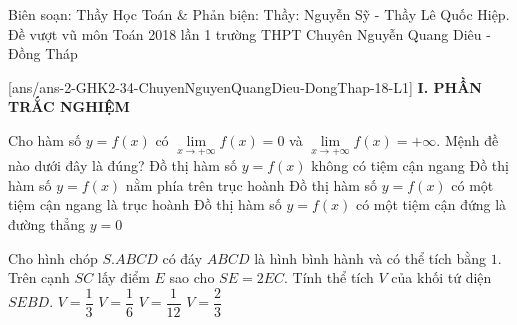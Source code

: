 
\begin{name}
{Biên soạn: Thầy Học Toán  \& Phản biện: Thầy: Nguyễn Sỹ - Thầy Lê Quốc Hiệp.}
		{Đề vượt vũ môn Toán 2018 lần 1 trường THPT Chuyên Nguyễn Quang Diêu - Đồng Tháp}
	\end{name}
	\setcounter{ex}{0}\setcounter{bt}{0}
	[ans/ans-2-GHK2-34-ChuyenNguyenQuangDieu-DongThap-18-L1]
\noindent\textbf{I. PHẦN TRẮC NGHIỆM}
\begin{ex}%
Cho hàm số $y=f(x)$ có $\lim\limits_{x\to +\infty}f(x)=0$ và $\lim\limits_{x\to +\infty}f(x)=+\infty$. Mệnh đề nào dưới đây là đúng?
\choice
{Đồ thị hàm số $y=f(x)$ không có tiệm cận ngang}
{Đồ thị hàm số $y=f(x)$ nằm phía trên trục hoành}
{\True Đồ thị hàm số $y=f(x)$ có một tiệm cận ngang là trục hoành}
{Đồ thị hàm số $y=f(x)$ có một tiệm cận đứng là đường thẳng $y=0$}
\end{ex}

\begin{ex}%
Cho hình chóp $S.ABCD$ có đáy $ABCD$ là hình bình hành và có thể tích bằng $1$. Trên cạnh $SC$ lấy điểm $E$ sao cho $SE=2EC$. Tính thể tích $V$ của khối tứ diện $SEBD$.
\choice
{\True $V=\dfrac{1}{3}$}
{$V=\dfrac{1}{6}$}
{$V=\dfrac{1}{12}$}
{$V=\dfrac{2}{3}$}
\end{ex}

